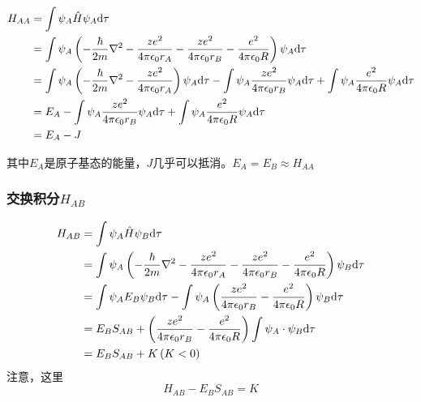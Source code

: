 \begin{align*}
    H_{AA} & = \int \psi_A \hat{H} \psi_A \mathrm{d} \tau                                                                                                                                                                                           \\
           & = \int \psi_A \left( -\frac{\hbar}{2m} \nabla^2 - \frac{ze^2}{4\pi\epsilon_0r_A} - \frac{ze^2}{4\pi\epsilon_0r_B} -  \frac{e^2}{4\pi\epsilon_0R}  \right) \psi_A \mathrm{d} \tau                                                       \\
           & = \int \psi_A \left( -\frac{\hbar}{2m} \nabla^2 - \frac{ze^2}{4\pi\epsilon_0r_A} \right) \psi_A \mathrm{d} \tau  - \int \psi_A \frac{ze^2}{4\pi\epsilon_0r_B} \psi_A \mathrm{d} \tau + \int \psi_A  \frac{e^2}{4\pi\epsilon_0R} \psi_A \mathrm{d} \tau \\
           & = E_A - \int \psi_A \frac{ze^2}{4\pi\epsilon_0r_B} \psi_A \mathrm{d} \tau + \int \psi_A  \frac{e^2}{4\pi\epsilon_0R} \psi_A \mathrm{d} \tau                                                                                                    \\
           & = E_A - J
\end{align*}

其中$E_A$是原子基态的能量，$J$几乎可以抵消。$E_A = E_B \approx H_{AA}$

\subsubsection{交换积分$H_{AB}$}

\begin{align*}
    H_{AB} & = \int \psi_A \hat{H} \psi_B \mathrm{d} \tau                                                                                                                                     \\
           & = \int \psi_A \left( -\frac{\hbar}{2m} \nabla^2 - \frac{ze^2}{4\pi\epsilon_0r_A} - \frac{ze^2}{4\pi\epsilon_0r_B} -  \frac{e^2}{4\pi\epsilon_0R}  \right) \psi_B \mathrm{d} \tau \\
           & = \int \psi_A E_B \psi_B \mathrm{d} \tau - \int \psi_A \left(\frac{ze^2}{4\pi\epsilon_0r_B} - \frac{e^2}{4\pi\epsilon_0R} \right) \psi_B \mathrm{d} \tau                                 \\
           & = E_BS_{AB} +  \left(\frac{ze^2}{4\pi\epsilon_0r_B} - \frac{e^2}{4\pi\epsilon_0R} \right) \int \psi_A \cdot \psi_B \mathrm{d} \tau                                               \\
           & = E_BS_{AB} + K \left( K < 0 \right)                                                                                                                                     \\
\end{align*}
注意，这里
\begin{equation*}
    H_{AB} - E_BS_{AB} = K
\end{equation*}

